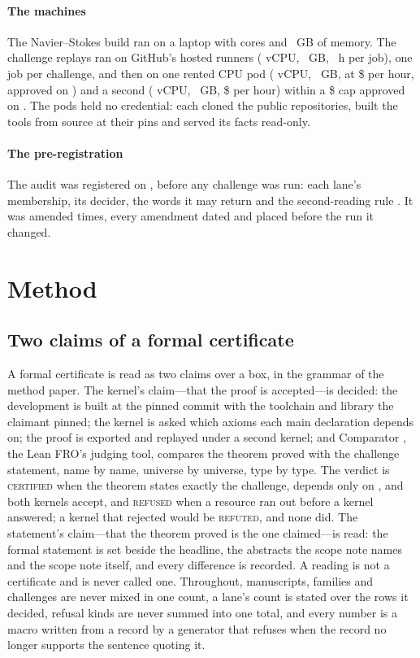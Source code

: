 \documentclass[preprint,11pt,authoryear,a4paper]{elsarticle}
\newcommand{\vword}[1]{{\normalfont\scshape #1}}
\newcommand{\vC}{\vword{certified}}
\newcommand{\vR}{\vword{refuted}}
\newcommand{\vF}{\vword{refused}}
\begin{document}
\paragraph{The machines} The Navier--Stokes build ran on a laptop with \MtDeskCpus{} cores and \MtDeskMemory~GB of memory. The challenge replays ran on GitHub's hosted runners (\OmRunnerVcpu{} vCPU, \OmRunnerMemGB~GB, \OmRunnerHours~h per job), one job per challenge, and then on one rented CPU pod (\OmPodVcpu{} vCPU, \OmPodMemGB~GB, at \$\OmPodPrice{} per hour, approved on \OmPodDate) and a second (\OmPodTwoVcpu{} vCPU, \OmPodTwoMemGB~GB, \$\OmPodTwoPrice{} per hour) within a \$\OmPodTwoCap{} cap approved on \OmPodTwoDate. The pods held no credential: each cloned the public repositories, built the tools from source at their pins and served its facts read-only.

\paragraph{The pre-registration} The audit was registered on \OmPreregDate, before any challenge was run: each lane's membership, its decider, the words it may return and the second-reading rule \citep[the openai/math report]{CMArchive}. It was amended \OmAmendments{} times, every amendment dated and placed before the run it changed.

\section{Method}\label{sec:method}

\subsection{Two claims of a formal certificate}\label{sec:two}
A formal certificate is read as two claims over a box, in the grammar of the method paper. The kernel's claim---that the proof is accepted---is decided: the development is built at the pinned commit with the toolchain and library the claimant pinned; the kernel is asked which axioms each main declaration depends on; the proof is exported and replayed under a second kernel; and Comparator \citep{Comparator}, the Lean FRO's judging tool, compares the theorem proved with the challenge statement, name by name, universe by universe, type by type. The verdict is \vC{} when the theorem states exactly the challenge, depends only on \AxiomList, and both kernels accept, and \vF{} when a resource ran out before a kernel answered; a kernel that rejected would be \vR, and none did. The statement's claim---that the theorem proved is the one claimed---is read: the formal statement is set beside the headline, the abstracts the scope note names and the scope note itself, and every difference is recorded. A reading is not a certificate and is never called one. Throughout, manuscripts, families and challenges are never mixed in one count, a lane's count is stated over the rows it decided, refusal kinds are never summed into one total, and every number is a macro written from a record by a generator that refuses when the record no longer supports the sentence quoting it.
\end{document}
